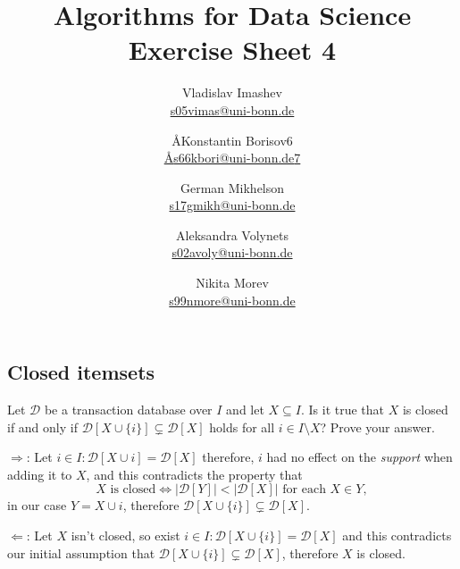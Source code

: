 \documentclass{article}
\title{Algorithms for Data Science \\ Exercise Sheet 4}
\author{
  Vladislav Imashev \\ \href{mailto:s05vimas@uni-bonn.de}{s05vimas@uni-bonn.de} \and
  \AA{Konstantin Borisov}{6} \\ \href{mailto:\AA{s66kbori@uni-bonn.de}{7}}{\AA{s66kbori@uni-bonn.de}{7}} \and
  German Mikhelson \\ \href{mailto:s17gmikh@uni-bonn.de}{s17gmikh@uni-bonn.de} \and
  Aleksandra Volynets \\ \href{mailto:s02avoly@uni-bonn.de}{s02avoly@uni-bonn.de} \and
  Nikita Morev \\ \href{mailto:s99nmore@uni-bonn.de}{s99nmore@uni-bonn.de}
}
\begin{document}
  \maketitle

  \setcounter{section}{4}
  \subsection{Closed itemsets}
  \begin{centerframebox}
    Let $\mathcal{D}$ be a transaction database over $I$ and let $X \subseteq I$. Is
    it true that $X$ is closed if and only if $\mathcal{D}[X \cup \{i\}] \subsetneq \mathcal{D}[X]$ holds for all
    $i \in I \setminus X$? Prove your answer.
  \end{centerframebox}

  $\Rightarrow$: Let $i \in I: \mathcal{D}[X \cup {i}] = \mathcal{D}[X]$ therefore, $i$ had no effect on the \textit{support} when adding it to $X$, and this contradicts the property that
  \[X\text{ is closed} \iff |\mathcal{D}[Y]| < |\mathcal{D}[X]| \text{ for each } X \in Y, \]
  in our case $Y = X \cup {i}$, therefore $\mathcal{D}[X \cup \{i\}] \subsetneq \mathcal{D}[X]$.

  $\Leftarrow$: Let $X$ isn't closed, so exist $i \in I: \mathcal{D}[X \cup \{i\}] = \mathcal{D}[X]$ and this contradicts our initial assumption that $\mathcal{D}[X \cup \{i\}] \subsetneq \mathcal{D}[X]$, therefore $X$ is closed.
\end{document}
